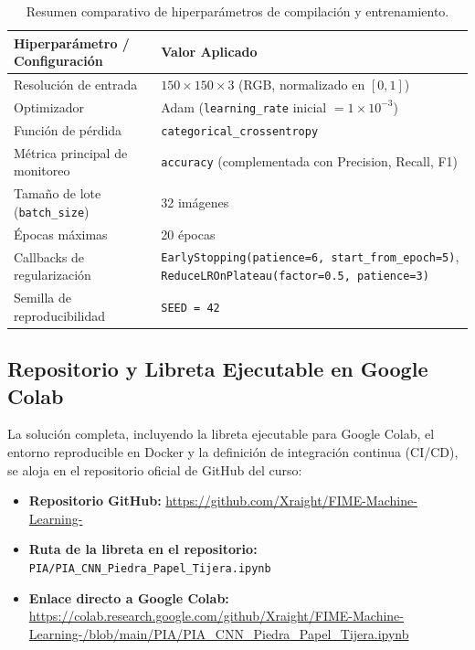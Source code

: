 \begin{table}[H]
    \centering
    \caption{Resumen comparativo de hiperparámetros de compilación y entrenamiento.}
    \label{tab:hiperparametros}
    \begin{tabular}{ll}
        \toprule
        \textbf{Hiperparámetro / Configuración} & \textbf{Valor Aplicado} \\
        \midrule
        Resolución de entrada & $150 \times 150 \times 3$ (RGB, normalizado en $[0, 1]$) \\
        Optimizador & Adam (\texttt{learning\_rate} inicial $= 1\times 10^{-3}$) \\
        Función de pérdida & \texttt{categorical\_crossentropy} \\
        Métrica principal de monitoreo & \texttt{accuracy} (complementada con Precision, Recall, F1) \\
        Tamaño de lote (\texttt{batch\_size}) & 32 imágenes \\
        Épocas máximas & 20 épocas \\
        Callbacks de regularización & \texttt{EarlyStopping(patience=6, start\_from\_epoch=5)}, \texttt{ReduceLROnPlateau(factor=0.5, patience=3)} \\
        Semilla de reproducibilidad & \texttt{SEED = 42} \\
        \bottomrule
    \end{tabular}
\end{table}

\subsection{Repositorio y Libreta Ejecutable en Google Colab}

La solución completa, incluyendo la libreta ejecutable para Google Colab, el entorno reproducible en Docker y la definición de integración continua (CI/CD), se aloja en el repositorio oficial de GitHub del curso:
\begin{itemize}
    \item \textbf{Repositorio GitHub:} \url{https://github.com/Xraight/FIME-Machine-Learning-}
    \item \textbf{Ruta de la libreta en el repositorio:} \texttt{PIA/PIA\_CNN\_Piedra\_Papel\_Tijera.ipynb}
    \item \textbf{Enlace directo a Google Colab:} \url{https://colab.research.google.com/github/Xraight/FIME-Machine-Learning-/blob/main/PIA/PIA_CNN_Piedra_Papel_Tijera.ipynb}
\end{itemize}

